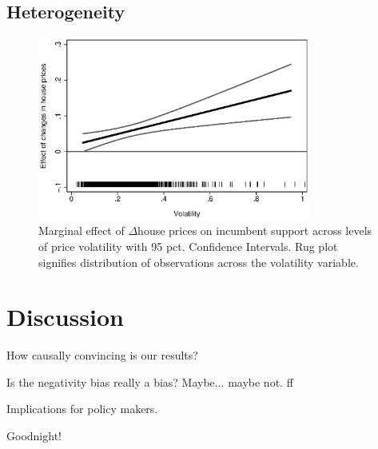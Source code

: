 \documentclass[12pt,a4paper]{article}
\begin{document}
\subsection{Heterogeneity}





\begin{figure}
	\includegraphics[width=0.8\textwidth]{../figures/volatilityinteraction.eps}
	\centering
	\caption{Marginal effect of $\Delta$house prices on incumbent support across levels of price volatility with 95 pct. Confidence Intervals. Rug plot signifies distribution of observations across the volatility variable.}
\end{figure}







\section{Discussion}

How causally convincing is our results?

Is the negativity bias really a bias? Maybe... maybe not.  ff

Implications for policy makers.

Goodnight!








\clearpage

\singlespacing



\end{document}
